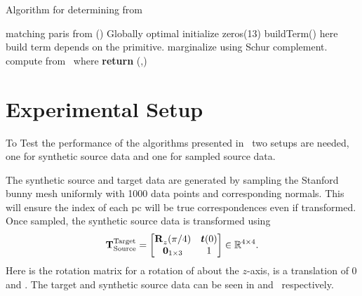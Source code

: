 \begin{algorithm}
	\algrenewcommand{}
	\algrenewcommand{}
	\caption{Algorithm for determining \tf[T]{\star}{} from }
	\label{alg:t-star}
	\begin{algorithmic}[1]
		\Require matching paris from ()
		\Ensure Globally optimal \tf[T]{\star}{}
		\State initialize  zeros(\num{13})
			\State {} buildTerm() here build term depends on the primitive.
			\State {}
		\EndFor
		\State marginalize  using Schur complement.
		\State compute \tf[R]{\star}{} from~
		\State {} where 
		\State \textbf{return} \tf[T]{\star}{}(\tf[R]{\star}{},)
	\end{algorithmic}
\end{algorithm}

\newpage

\section{Experimental Setup}\label{sec:2-pose-estimation-experimental-setup}

To Test the performance of the algorithms presented in~ two setups are needed, one for synthetic source data and one for sampled source data. \medskip

The synthetic source and target data are generated by sampling the Stanford bunny mesh uniformly with \num{1000} data points and corresponding normals. This will ensure the index  of each \gls{pc} will be true correspondences even if transformed. Once sampled, the synthetic source data is transformed using
%
\begin{equation}
	\tf[T]{\text{Target}}{\text{Source}} = 
	\begin{bmatrix}
		\tf[R]{}{z}(\pi/4) & \vec{t}(0) \\
		\vec{0}_{1\times 3} & 1
	\end{bmatrix}\inR{4\times 4}.
\end{equation} 
Here  is the rotation matrix for a rotation of  about the $z$-axis,  is a translation of \num{0} and . The target and synthetic source data can be seen in  and~ respectively. \medskip

